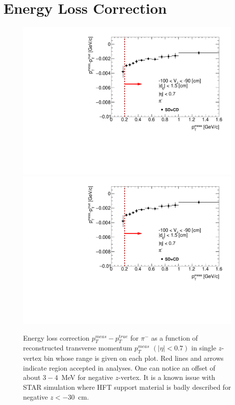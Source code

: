 
\chapter{Energy Loss Correction}\label{appendix:energyLoss}
\begin{figure}[H]
\caption[Energy loss correction for $\pi^-$ as a function of reconstructed transverse momentum $p_T^{meas}$.]{Energy loss correction $p_T^{meas}-p_T^{true}$ for $\pi^-$ as a function of reconstructed transverse momentum $p_T^{meas}$ $\left(|\eta|<0.7\right)$ in single $z$-vertex bin whose range is given on each plot. Red lines and arrows indicate region accepted in analyses. One can notice an offset of about $3-4$~MeV for negative $z$-vertex. It is a known issue with STAR simulation where HFT support material is badly described for negative $z<-30$~cm.}\label{fig:energyLossPrimaryPi_minus}
\centering
\parbox{0.329\textwidth}{
  \centering
  \includegraphics[width=\linewidth,page=3]{graphics/energyLoss/energyLoss3D_OnePrtAlso.pdf}\\
  \includegraphics[width=\linewidth,page=6]{graphics/energyLoss/energyLoss3D_OnePrtAlso.pdf}\\
}
\end{figure}
